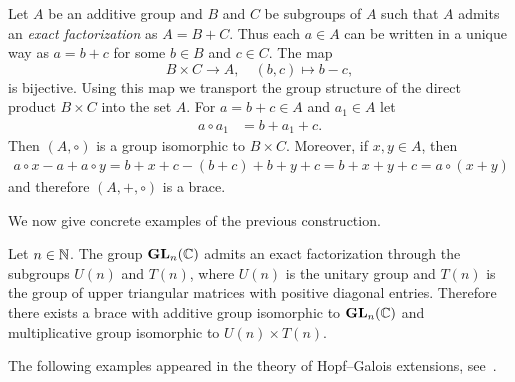 \begin{example}
    \label{exa:WX}
    Let $A$ be an additive group
	and $B$ and $C$ be subgroups of $A$ such that $A$ admits an \emph{exact
	factorization} as $A=B+C$. Thus each $a\in A$ can be written in a unique
	way as $a=b+c$ for some $b\in B$ and $c\in C$.  The map
	\[
		B\times C\to A,\quad
		(b,c)\mapsto b-c,
	\]
	is bijective. Using this map we transport the group structure of the direct
	product $B\times C$ into the set $A$. For $a=b+c\in A$ and
	$a_1\in A$ let 
	\begin{align*}
		a\circ a_1&=b+a_1+c.
	\end{align*}
	Then $(A,\circ)$ is a group isomorphic to $B\times C$. Moreover, if $x,y\in A$, 
	then 
	\begin{align*}
	a\circ x-a+a\circ y=b+x+c-(b+c)+b+y+c=b+x+y+c=a\circ (x+y)
	\end{align*}
	and therefore $(A,+,\circ)$ is a brace. 
\end{example}


We now give concrete examples of the previous construction. 

\begin{example}
  \label{exa:QR}
  Let $n\in\mathbb{N}$.  The group $\mathbf{GL}_n(\mathbb{C})$ admits an
  exact factorization through the subgroups $U(n)$ and $T(n)$, where $U(n)$
  is the unitary group and $T(n)$ is the group of upper triangular matrices
  with positive diagonal entries.  Therefore there exists a brace with additive group 
  isomorphic to $\mathbf{GL}_n(\mathbb{C})$ and multiplicative group isomorphic to $U(n)\times T(n)$.  
\end{example}

The following examples appeared in the theory of Hopf--Galois 
extensions, see~\cite[Corollary 1.1]{MR3425626}.

